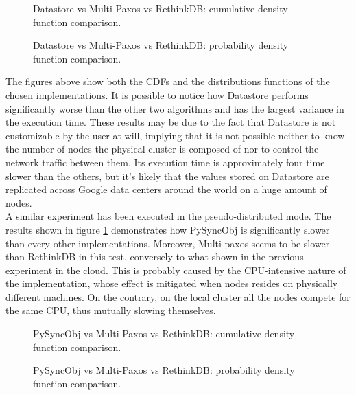 \begin{figure}[H]
  \caption{Datastore vs Multi-Paxos vs RethinkDB: cumulative density function comparison.}
\end{figure}

\begin{figure}[H]
  \caption{Datastore vs Multi-Paxos vs RethinkDB: probability density function comparison.}
\end{figure}

The figures above show both the CDFs and the distributions functions of the chosen implementations. It is possible to notice how Datastore performs significantly worse than the other two algorithms and has the largest variance in the execution time. These results may be due to the fact that Datastore is not customizable by the user at will, implying that it is not possible neither to know the number of nodes the physical cluster is composed of nor to control the network traffic between them. Its execution time is approximately four time slower than the others, but it’s likely that the values stored on Datastore are replicated across Google data centers around the world on a huge amount of nodes.\\
A similar experiment has been executed in the pseudo-distributed mode. The results shown in figure \ref{local_standard} demonstrates how PySyncObj is significantly slower than every other implementations. Moreover, Multi-paxos seems to be slower than RethinkDB in this test, conversely to what shown in the previous experiment in the cloud. This is probably caused by the CPU-intensive nature of the implementation, whose effect is mitigated when nodes resides on physically different machines. On the contrary, on the local cluster all the nodes compete for the same CPU, thus mutually slowing themselves.

\begin{figure}[H]
  \caption{PySyncObj vs Multi-Paxos vs RethinkDB: cumulative density function comparison.}
  \label{local_standard}
\end{figure}

\begin{figure}[H]
  \caption{PySyncObj vs Multi-Paxos vs RethinkDB: probability density function comparison.}
\end{figure}

